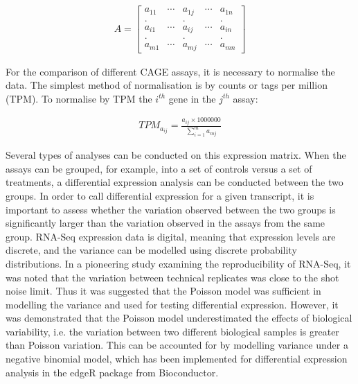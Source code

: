 \begin{align*}
   A = \begin{bmatrix} a_{11} & \cdots & a_{1j} & \cdots & a_{1n} \\
   . && . && . \\
   a_{i1} & \cdots & a_{ij} & \cdots & a_{in} \\
   . && . && . \\
   a_{m1} & \cdots & a_{mj} & \cdots & a_{mn} \end{bmatrix}
\end{align*}

For the comparison of different CAGE assays, it is necessary to normalise the data. The simplest method of normalisation is by counts or tags per million (TPM). To normalise by TPM the $i^{th}$ gene in the $j^{th}$ assay:

\begin{align*}
   TPM_{a_{ij}} = \frac{a_{ij} \times 1000000}{\sum_{i=1}^{m}{a_{mj}}}
\end{align*}

Several types of analyses can be conducted on this expression matrix. When the assays can be grouped, for example, into a set of controls versus a set of treatments, a differential expression analysis can be conducted between the two groups. In order to call differential expression for a given transcript, it is important to assess whether the variation observed between the two groups is significantly larger than the variation observed in the assays from the same group. RNA-Seq expression data is digital, meaning that expression levels are discrete, and the variance can be modelled using discrete probability distributions. In a pioneering study examining the reproducibility of RNA-Seq, it was noted that the variation between technical replicates was close to the shot noise limit\cite{pmid18550803}. Thus it was suggested that the Poisson model was sufficient in modelling the variance and used for testing differential expression. However, it was demonstrated that the Poisson model underestimated the effects of biological variability, i.e. the variation between two different biological samples is greater than Poisson variation\cite{20979621}. This can be accounted for by modelling variance under a negative binomial model, which has been implemented for differential expression analysis in the edgeR package\cite{pmid19910308} from Bioconductor\cite{pmid15461798}.

